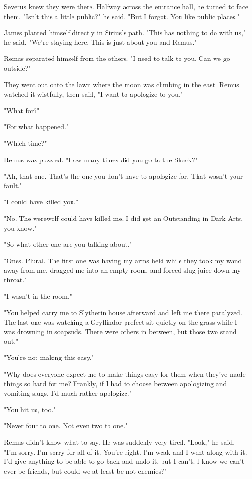 Severus knew they were there. Halfway across the entrance hall, he turned to face them. "Isn't this a little public?" he said. "But I forgot. You like public places."

James planted himself directly in Sirius's path. "This has nothing to do with us," he said. "We're staying here. This is just about you and Remus."

Remus separated himself from the others. "I need to talk to you. Can we go outside?"

They went out onto the lawn where the moon was climbing in the east. Remus watched it wistfully, then said, "I want to apologize to you."

"What for?"

"For what happened."

"Which time?"

Remus was puzzled. "How many times did you go to the Shack?"

"Ah, that one. That's the one you don't have to apologize for. That wasn't your fault."

"I could have killed you."

"No. The werewolf could have killed me. I did get an Outstanding in Dark Arts, you know."

"So what other one are you talking about."

"Ones. Plural. The first one was having my arms held while they took my wand away from me, dragged me into an empty room, and forced slug juice down my throat."

"I wasn't in the room."

"You helped carry me to Slytherin house afterward and left me there paralyzed. The last one was watching a Gryffindor prefect sit quietly on the grass while I was drowning in soapsuds. There were others in between, but those two stand out."

"You're not making this easy."

"Why does everyone expect me to make things easy for them when they've made things so hard for me? Frankly, if I had to choose between apologizing and vomiting slugs, I'd much rather apologize."

"You hit us, too."

"Never four to one. Not even two to one."

Remus didn't know what to say. He was suddenly very tired. "Look," he said, "I'm sorry. I'm sorry for all of it. You're right. I'm weak and I went along with it. I'd give anything to be able to go back and undo it, but I can't. I know we can't ever be friends, but could we at least be not enemies?"


